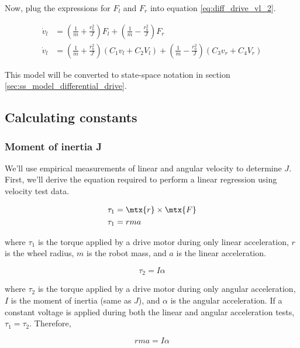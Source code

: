 Now, plug the expressions for $F_l$ and $F_r$ into equation
\eqref{eq:diff_drive_vl_2}.

\begin{align}
  \dot{v}_l &= \left(\frac{1}{m} + \frac{r_b^2}{J}\right) F_l +
    \left(\frac{1}{m} - \frac{r_b^2}{J}\right) F_r \nonumber \\
  \dot{v}_l &= \left(\frac{1}{m} + \frac{r_b^2}{J}\right)
    \left(C_1 v_l + C_2 V_l\right) +
    \left(\frac{1}{m} - \frac{r_b^2}{J}\right) \left(C_3 v_r + C_4 V_r\right)
    \label{eq:diff_drive_model_left}
\end{align}

This model will be converted to state-space notation in section
\ref{sec:ss_model_differential_drive}.

\subsection{Calculating constants}

\subsubsection{Moment of inertia J}

We'll use empirical measurements of linear and angular velocity to determine
$J$. First, we'll derive the equation required to perform a linear regression
using velocity test data.

\begin{align*}
  \tau_1 &= \mtx{r} \times \mtx{F} \\
  \tau_1 &= rma
\end{align*}

where $\tau_1$ is the torque applied by a drive motor during only linear
acceleration, $r$ is the wheel radius, $m$ is the robot mass, and $a$ is the
linear acceleration.

\begin{equation*}
  \tau_2 = I \alpha
\end{equation*}

where $\tau_2$ is the torque applied by a drive motor during only angular
acceleration, $I$ is the moment of inertia (same as $J$), and $\alpha$ is the
angular acceleration. If a constant voltage is applied during both the linear
and angular acceleration tests, $\tau_1 = \tau_2$. Therefore,

\begin{equation*}
  rma = I \alpha
\end{equation*}


